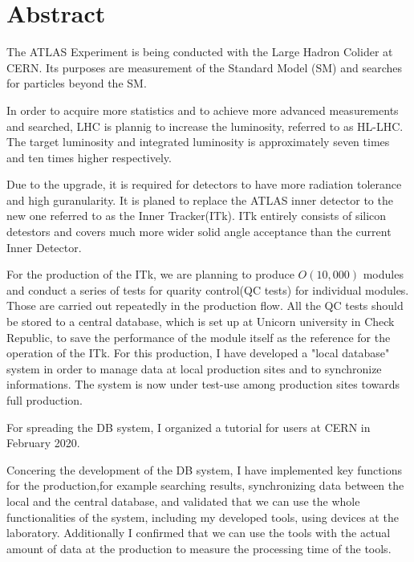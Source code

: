 \chapter*{Abstract}

The ATLAS Experiment is being conducted with the Large Hadron Colider at CERN. Its purposes are measurement of the Standard Model (SM) and searches for particles beyond the SM.

In order to acquire more statistics and to achieve more advanced measurements and searched, LHC is plannig to increase the luminosity, referred to as HL-LHC.
The target luminosity and integrated luminosity is approximately seven times and ten times higher respectively.

Due to the upgrade, it is required for detectors to have more radiation tolerance and high guranularity. 
It is planed to replace the ATLAS inner detector to the new one referred to as the Inner Tracker(ITk). 
ITk entirely consists of silicon detestors and covers much more wider solid angle acceptance than the current Inner Detector.

For the production of the ITk, we are planning to produce $O(10,000)$ modules and conduct a series of tests for quarity control(QC tests) for individual modules. 
Those are carried out repeatedly in the production flow.
All the QC tests should be stored to a central database, which is set up at Unicorn university in Check Republic, to save the performance of the module itself as the reference for the operation of the ITk. 
For this production, I have developed a "local database" system in order to manage data at local production sites and to synchronize informations. The system is now under test-use among production sites towards full production.

For spreading the DB system, I organized a tutorial for users at CERN in February 2020. 

Concering the development of the DB system, I have implemented key functions for the production,for example searching results, synchronizing data between the local and the central database, and validated that we can use the whole functionalities of the system, including my developed tools, using devices at the laboratory. 
Additionally I confirmed that we can use the tools with the actual amount of data at the production to measure the processing time of the tools.

